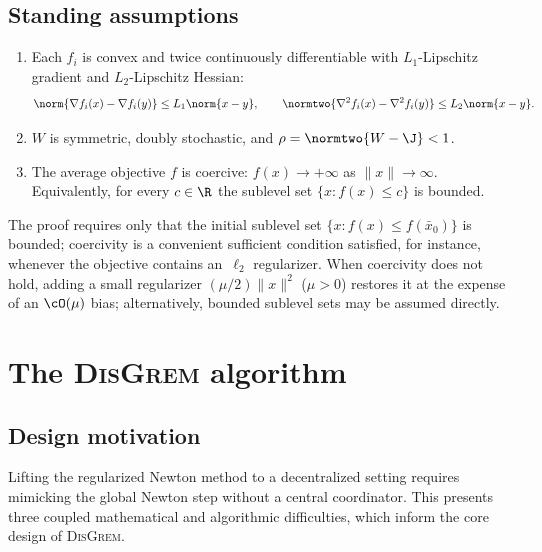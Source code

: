 \documentclass[review,onefignum,onetabnum]{siamart171218}
\begin{document}
	\subsection{Standing assumptions}
	\begin{assumption}\label{ass:standing}
		\begin{enumerate}[nosep,leftmargin=1em]
		\item Each $f_i$ is convex and twice continuously differentiable
		with $L_1$-Lipschitz gradient and $L_2$-Lipschitz Hessian:
			\[
			\norm{\nabla f_i(x)-\nabla f_i(y)}\le L_1\norm{x-y},
			\qquad
			\normtwo{\nabla^2 f_i(x)-\nabla^2 f_i(y)}\le L_2\norm{x-y}.
			\]
			\item $W$ is symmetric, doubly stochastic, and $\rho=\normtwo{W-\J}<1$.
		\item The average objective $f$ is coercive: $f(x)\to+\infty$ as $\|x\|\to\infty$.
			Equivalently, for every $c\in\R$ the sublevel set $\{x:f(x)\le c\}$ is bounded.
		\end{enumerate}
	\end{assumption}

	\begin{remark}
	The proof requires only that the initial sublevel set
	$\{x : f(x) \le f(\bar x_0)\}$ is bounded;
	coercivity is a convenient sufficient condition satisfied,
	for instance, whenever the objective contains an~$\ell_2$
	regularizer.
	When coercivity does not hold, adding a small regularizer
	$(\mu/2)\|x\|^2$ ($\mu>0$) restores it at the expense of an
	$\cO(\mu)$ bias; alternatively, bounded sublevel sets may be
	assumed directly.
	\end{remark}

	
\section{The \textsc{DisGrem} algorithm}\label{sec:alg}
	
	\subsection{Design motivation}\label{ssec:design}

	Lifting the regularized Newton method to a decentralized setting
	requires mimicking the global Newton step without a central
	coordinator.
	This presents three coupled mathematical and algorithmic
	difficulties, which inform the core design of \textsc{DisGrem}.
\end{document}
